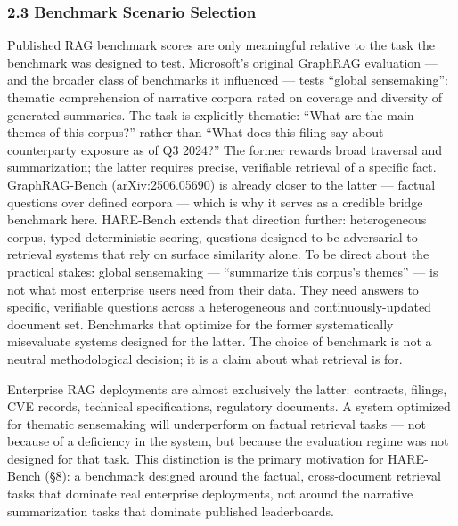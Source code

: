 \documentclass[
]{article}
\begin{document}
\subsubsection{2.3 Benchmark Scenario
Selection}\label{benchmark-scenario-selection}

Published RAG benchmark scores are only meaningful relative to the task
the benchmark was designed to test. Microsoft's original GraphRAG
evaluation --- and the broader class of benchmarks it influenced ---
tests ``global sensemaking'': thematic comprehension of narrative
corpora rated on coverage and diversity of generated summaries. The task
is explicitly thematic: ``What are the main themes of this corpus?''
rather than ``What does this filing say about counterparty exposure as
of Q3 2024?'' The former rewards broad traversal and summarization; the
latter requires precise, verifiable retrieval of a specific fact.
GraphRAG-Bench (arXiv:2506.05690) is already closer to the latter ---
factual questions over defined corpora --- which is why it serves as a
credible bridge benchmark here. HARE-Bench extends that direction
further: heterogeneous corpus, typed deterministic scoring, questions
designed to be adversarial to retrieval systems that rely on surface
similarity alone. To be direct about the practical stakes: global
sensemaking --- ``summarize this corpus's themes'' --- is not what most
enterprise users need from their data. They need answers to specific,
verifiable questions across a heterogeneous and continuously-updated
document set. Benchmarks that optimize for the former systematically
misevaluate systems designed for the latter. The choice of benchmark is
not a neutral methodological decision; it is a claim about what
retrieval is for.

Enterprise RAG deployments are almost exclusively the latter: contracts,
filings, CVE records, technical specifications, regulatory documents. A
system optimized for thematic sensemaking will underperform on factual
retrieval tasks --- not because of a deficiency in the system, but
because the evaluation regime was not designed for that task. This
distinction is the primary motivation for HARE-Bench (§8): a benchmark
designed around the factual, cross-document retrieval tasks that
dominate real enterprise deployments, not around the narrative
summarization tasks that dominate published leaderboards.
\end{document}
